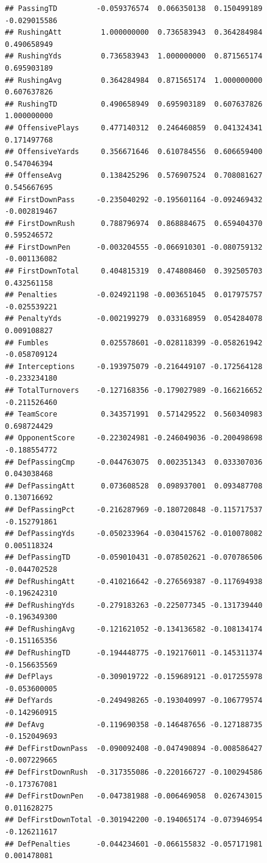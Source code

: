 \documentclass[
]{book}
\begin{document}
\begin{verbatim}
## PassingTD         -0.059376574  0.066350138  0.150499189 -0.029015586
## RushingAtt         1.000000000  0.736583943  0.364284984  0.490658949
## RushingYds         0.736583943  1.000000000  0.871565174  0.695903189
## RushingAvg         0.364284984  0.871565174  1.000000000  0.607637826
## RushingTD          0.490658949  0.695903189  0.607637826  1.000000000
## OffensivePlays     0.477140312  0.246460859  0.041324341  0.171497768
## OffensiveYards     0.356671646  0.610784556  0.606659400  0.547046394
## OffenseAvg         0.138425296  0.576907524  0.708081627  0.545667695
## FirstDownPass     -0.235040292 -0.195601164 -0.092469432 -0.002819467
## FirstDownRush      0.788796974  0.868884675  0.659404370  0.595246572
## FirstDownPen      -0.003204555 -0.066910301 -0.080759132 -0.001136082
## FirstDownTotal     0.404815319  0.474808460  0.392505703  0.432561158
## Penalties         -0.024921198 -0.003651045  0.017975757 -0.025539221
## PenaltyYds        -0.002199279  0.033168959  0.054284078  0.009108827
## Fumbles            0.025578601 -0.028118399 -0.058261942 -0.058709124
## Interceptions     -0.193975079 -0.216449107 -0.172564128 -0.233234180
## TotalTurnovers    -0.127168356 -0.179027989 -0.166216652 -0.211526460
## TeamScore          0.343571991  0.571429522  0.560340983  0.698724429
## OpponentScore     -0.223024981 -0.246049036 -0.200498698 -0.188554772
## DefPassingCmp     -0.044763075  0.002351343  0.033307036  0.043038468
## DefPassingAtt      0.073608528  0.098937001  0.093487708  0.130716692
## DefPassingPct     -0.216287969 -0.180720848 -0.115717537 -0.152791861
## DefPassingYds     -0.050233964 -0.030415762 -0.010078082  0.005118324
## DefPassingTD      -0.059010431 -0.078502621 -0.070786506 -0.044702528
## DefRushingAtt     -0.410216642 -0.276569387 -0.117694938 -0.196242310
## DefRushingYds     -0.279183263 -0.225077345 -0.131739440 -0.196349300
## DefRushingAvg     -0.121621052 -0.134136582 -0.108134174 -0.151165356
## DefRushingTD      -0.194448775 -0.192176011 -0.145311374 -0.156635569
## DefPlays          -0.309019722 -0.159689121 -0.017255978 -0.053600005
## DefYards          -0.249498265 -0.193040997 -0.106779574 -0.142960915
## DefAvg            -0.119690358 -0.146487656 -0.127188735 -0.152049693
## DefFirstDownPass  -0.090092408 -0.047490894 -0.008586427 -0.007229665
## DefFirstDownRush  -0.317355086 -0.220166727 -0.100294586 -0.173767081
## DefFirstDownPen   -0.047381988 -0.006469058  0.026743015  0.011628275
## DefFirstDownTotal -0.301942200 -0.194065174 -0.073946954 -0.126211617
## DefPenalties      -0.044234601 -0.066155832 -0.057171981  0.001478081

\end{verbatim}
\end{document}
